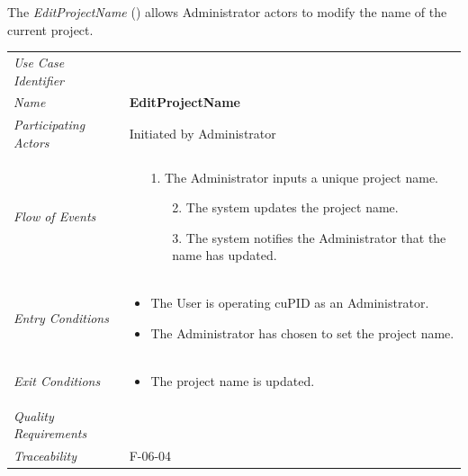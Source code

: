 \documentclass[12pt,letterpaper]{article}
\begin{document}
\vspace{1em}
The {\it EditProjectName} () allows Administrator actors to modify the name of the current project.

\begin{center}
	\begin{tabu} to 
		\toprule
		Use Case Identifier &  \\
		Name & {\bf EditProjectName} \\
		Participating Actors & Initiated by Administrator \\
		Flow of Events & 
		\begin{minipage}[t]{\linewidth}
		    \begin{enumerate}
			    \item[1.] The Administrator inputs a unique project name.
			    \begin{enumerate}
			        \item[2.] The system updates the project name.
			        \item[3.] The system notifies the Administrator that the name has updated.
			    \end{enumerate}
			\end{enumerate}
		\end{minipage} \\

		Entry Conditions &
		\begin{minipage}[t]{\linewidth}
			\begin{itemize}
			    \item The User is operating cuPID as an Administrator.
			    \item The Administrator has chosen to set the project name.
	        \end{itemize}
		\end{minipage} \\

		Exit Conditions &
		\begin{minipage}[t]{\linewidth}
			\begin{itemize}
			    \item The project name is updated.
	        \end{itemize}
		\end{minipage} \\

		Quality Requirements & \\

		Traceability & F-06-04 \\
		\toprule
	\end{tabu}
\end{center}
\end{document}
